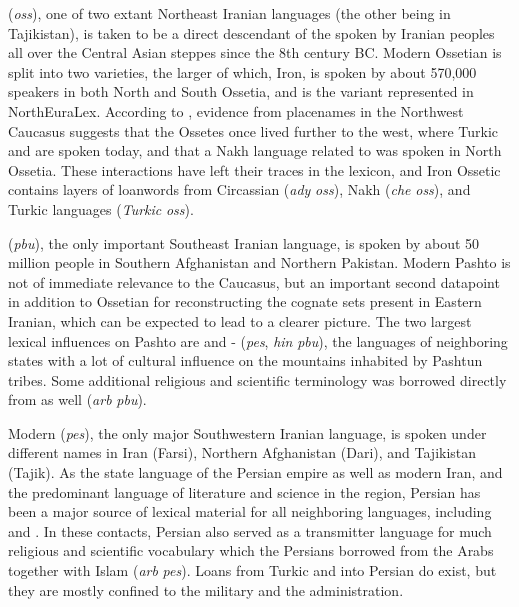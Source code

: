  (\textit{oss}), one of two extant Northeast Iranian languages (the other being  in Tajikistan), is taken to be a direct descendant of the  spoken by Iranian peoples all over the Central Asian steppes since the 8th century BC. Modern Ossetian is split into two varieties, the larger of which, Iron, is spoken by about 570,000 speakers in both North and South Ossetia, and is the variant represented in NorthEuraLex. According to \cite{thordarson2009}, evidence from placenames in the Northwest Caucasus suggests that the Ossetes once lived further to the west, where Turkic and  are spoken today, and that a Nakh language related to  was spoken in North Ossetia. These interactions have left their traces in the lexicon, and Iron Ossetic contains layers of loanwords from Circassian (\textit{ady} \arrowLA \textit{oss}), Nakh (\textit{che} \arrowLA \textit{oss}), and Turkic languages (\textit{Turkic} \arrowLA \textit{oss}).

 (\textit{pbu}), the only important Southeast Iranian language, is spoken by about 50 million people in Southern Afghanistan and Northern Pakistan. Modern Pashto is not of immediate relevance to the Caucasus, but an important second datapoint in addition to Ossetian for reconstructing the cognate sets present in Eastern Iranian, which can be expected to lead to a clearer picture. The two largest lexical influences on Pashto are  and - (\textit{pes}, \textit{hin} \arrowOA \textit{pbu}), the languages of neighboring states with a lot of cultural influence on the mountains inhabited by Pashtun tribes. Some additional religious and scientific terminology was borrowed directly from  as well (\textit{arb} \arrowLA \textit{pbu}).

Modern  (\textit{pes}), the only major Southwestern Iranian language, is spoken under different names in Iran (Farsi), Northern Afghanistan (Dari), and Tajikistan (Tajik). As the state language of the Persian empire as well as modern Iran, and the predominant language of literature and science in the region, Persian has been a major source of lexical material for all neighboring languages, including  and . In these contacts, Persian also served as a transmitter language for much religious and scientific vocabulary which the Persians borrowed from the Arabs together with Islam (\textit{arb} \arrowLA \textit{pes}). Loans from Turkic and  into Persian do exist, but they are mostly confined to the military and the administration.

